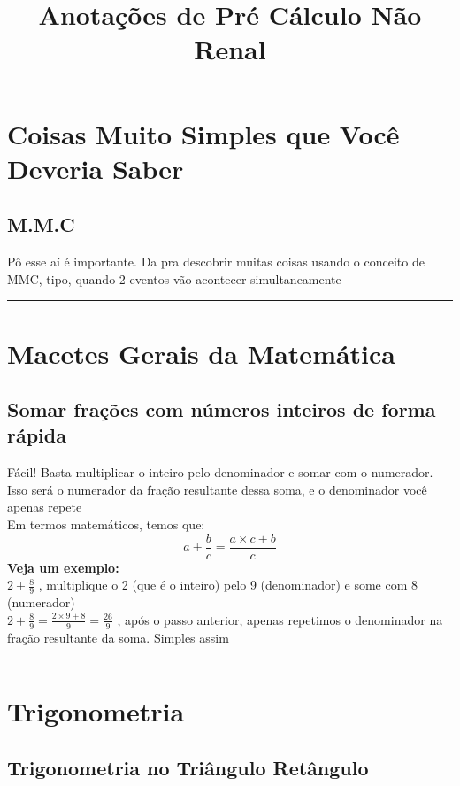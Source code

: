 \documentclass{article}
\title{Anotações de Pré Cálculo Não Renal}
\begin{document}
\maketitle

\tableofcontents

\section{Coisas Muito Simples que Você Deveria Saber}
\subsection{M.M.C}
Pô esse aí é importante. Da pra descobrir muitas coisas usando o conceito de MMC, tipo, quando 2 eventos vão acontecer simultaneamente

\vspace{15pt}
\hrule

\section{Macetes Gerais da Matemática}
\subsection{Somar frações com números inteiros de forma rápida}
Fácil! Basta multiplicar o inteiro pelo denominador e somar com o numerador. Isso será o numerador da fração resultante dessa soma, e o denominador você apenas repete\\[10pt]
Em termos matemáticos, temos que: 
\[
a + \frac{b}{c} = \frac{a\times c + b}{c}
\]
\textbf{Veja um exemplo:}\\[10pt]
$2 + \frac{8}{9}$ , multiplique o 2 (que é o inteiro) pelo 9 (denominador) e some com 8 (numerador)\\[10pt]
$2 + \frac{8}{9} = \frac{2 \times 9 + 8}{9} = \frac{26}{9}$ , após o passo anterior, apenas repetimos o denominador na fração resultante da soma. Simples assim
\vspace{15pt}
\hrule

\section{Trigonometria}

\subsection{Trigonometria no Triângulo Retângulo}
\end{document}
